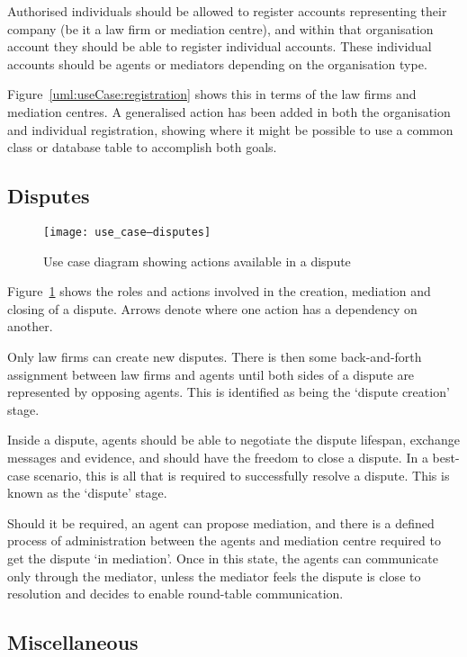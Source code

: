 Authorised individuals should be allowed to register accounts representing their company (be it a law firm or mediation centre), and within that organisation account they should be able to register individual accounts. These individual accounts should be agents or mediators depending on the organisation type.

Figure~\ref{uml:useCase:registration} shows this in terms of the law firms and mediation centres. A generalised action has been added in both the organisation and individual registration, showing where it might be possible to use a common class or database table to accomplish both goals.

\subsection{Disputes}

\begin{figure}[h!]
  \centering
    \ifimages
    \texttt{[image: use\_case--disputes]}
    \fi
  \caption{Use case diagram showing actions available in a dispute}
  \label{uml:useCase:disputes}
\end{figure}

Figure~\ref{uml:useCase:disputes} shows the roles and actions involved in the creation, mediation and closing of a dispute. Arrows denote where one action has a dependency on another.

Only law firms can create new disputes. There is then some back-and-forth assignment between law firms and agents until both sides of a dispute are represented by opposing agents. This is identified as being the `dispute creation' stage.

Inside a dispute, agents should be able to negotiate the dispute lifespan, exchange messages and evidence, and should have the freedom to close a dispute. In a best-case scenario, this is all that is required to successfully resolve a dispute. This is known as the `dispute' stage.

Should it be required, an agent can propose mediation, and there is a defined process of administration between the agents and mediation centre required to get the dispute `in mediation'. Once in this state, the agents can communicate only through the mediator, unless the mediator feels the dispute is close to resolution and decides to enable round-table communication.

\subsection{Miscellaneous}

